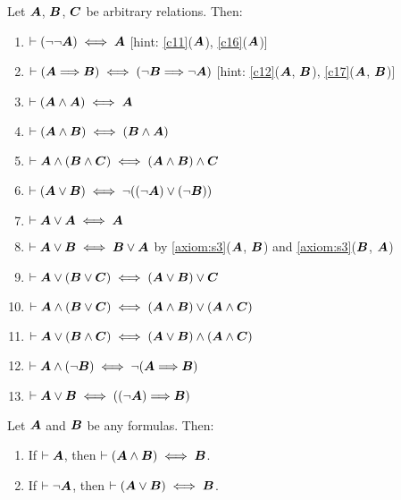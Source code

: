 \begin{dc}\label{c24}
Let $\boldsymbol{A}$, $\boldsymbol{B}$, $\boldsymbol{C}$ be
arbitrary relations. Then:
\begin{enumerate}
\item $\vdash(\neg\neg\boldsymbol{A})\iff\boldsymbol{A}$ [hint: \ref{c11}($\boldsymbol{A}$),
\ref{c16}($\boldsymbol{A}$)]
\item $\vdash(\boldsymbol{A}\Longrightarrow\boldsymbol{B})\iff(\neg\boldsymbol{B}\Longrightarrow\neg\boldsymbol{A})$
[hint: \ref{c12}($\boldsymbol{A}$, $\boldsymbol{B}$),
  \ref{c17}($\boldsymbol{A}$, $\boldsymbol{B}$)]
\item $\vdash(\boldsymbol{A}\land\boldsymbol{A})\iff\boldsymbol{A}$
\item $\vdash(\boldsymbol{A}\land\boldsymbol{B})\iff(\boldsymbol{B}\land\boldsymbol{A})$
\item $\vdash\boldsymbol{A}\land(\boldsymbol{B}\land\boldsymbol{C})\iff(\boldsymbol{A}\land\boldsymbol{B})\land\boldsymbol{C}$
\item $\vdash(\boldsymbol{A}\lor\boldsymbol{B})\iff\neg((\neg\boldsymbol{A})\lor(\neg\boldsymbol{B}))$
\item $\vdash\boldsymbol{A}\lor\boldsymbol{A}\iff\boldsymbol{A}$
\item $\vdash\boldsymbol{A}\lor\boldsymbol{B}\iff\boldsymbol{B}\lor\boldsymbol{A}$
by \ref{axiom:s3}($\boldsymbol{A}$, $\boldsymbol{B}$) and \ref{axiom:s3}($\boldsymbol{B}$, $\boldsymbol{A}$)
\item $\vdash\boldsymbol{A}\lor(\boldsymbol{B}\lor\boldsymbol{C})\iff(\boldsymbol{A}\lor\boldsymbol{B})\lor\boldsymbol{C}$
\item $\vdash\boldsymbol{A}\land(\boldsymbol{B}\lor\boldsymbol{C})\iff(\boldsymbol{A}\land\boldsymbol{B})\lor(\boldsymbol{A}\land\boldsymbol{C})$
\item $\vdash\boldsymbol{A}\lor(\boldsymbol{B}\land\boldsymbol{C})\iff(\boldsymbol{A}\lor\boldsymbol{B})\land(\boldsymbol{A}\land\boldsymbol{C})$
\item $\vdash\boldsymbol{A}\land(\neg\boldsymbol{B})\iff\neg(\boldsymbol{A}\Longrightarrow\boldsymbol{B})$
\item $\vdash\boldsymbol{A}\lor\boldsymbol{B}\iff((\neg\boldsymbol{A})\Longrightarrow\boldsymbol{B})$
\end{enumerate}
\end{dc}

\begin{dc}\label{c25}
Let $\boldsymbol{A}$ and $\boldsymbol{B}$ be any formulas. Then:
\begin{enumerate}
\item If $\vdash\boldsymbol{A}$, then $\vdash(\boldsymbol{A}\land\boldsymbol{B})\iff\boldsymbol{B}$.
\item If $\vdash\neg\boldsymbol{A}$, then $\vdash(\boldsymbol{A}\lor\boldsymbol{B})\iff\boldsymbol{B}$.
\end{enumerate}
\end{dc}
